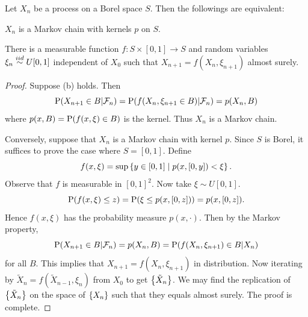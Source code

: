 \begin{proposition}
    Let $X_n$ be a process on a Borel space $S$. Then the followings are equivalent:
    \begin{thmenum}
        \item $X_n$ is a Markov chain with kernels $p$ on $S$. 
        \item There is a measurable function $f:S\times [0,1]\to S$ and random variables 
        $\xi_n\iidsim U[0,1]$ independent of $X_0$ such that $X_{n+1} = f(X_n, \xi_{n+1})$ 
        almost surely. 
    \end{thmenum}  
\end{proposition}
\begin{proof}
    Suppose (b) holds. Then 
    \begin{equation*}
        \P(X_{n+1}\in B|\F_n) = \P(f(X_n, \xi_{n+1}\in B)|\F_n) 
        = p(X_n, B)
    \end{equation*}
    where $p(x, B) = \P(f(x, \xi)\in B)$ is the kernel. Thus $X_n$ is a Markov 
    chain. 

    Conversely, suppose that $X_n$ is a Markov chain with kernel $p$. Since $S$ 
    is Borel, it suffices to prove the case where $S = [0,1]$. Define
    \begin{equation*}
        f(x, \xi) = \sup\Set{y\in [0,1]}{p(x, [0, y])< \xi}.
    \end{equation*}
    Observe that $f$ is measurable in $[0,1]^2$. Now take $\xi\sim U[0,1]$. 
    \begin{equation*}
        \P(f(x, \xi)\leq z) = \P(\xi\leq p(x, [0,z])) = p(x, [0,z]). 
    \end{equation*}
    Hence $f(x, \xi)$ has the probability measure $p(x,\cdot)$. Then by the Markov 
    property, 
    \begin{equation*}
        \P(X_{n+1}\in B|\F_n) = p(X_n, B) = \P(f(X_n, \xi_{n+1})\in B|X_n) 
    \end{equation*}
    for all $B$. This implies that $X_{n+1} = f(X_n, \xi_{n+1})$ in distribution. 
    Now iterating by $\tilde{X}_n = f(\tilde{X}_{n-1},\xi_n)$ from $X_0$ to get $\set{\tilde{X}_n}$. 
    We may find the replication of $\set{\tilde{X}_n}$ on the space of $\set{X_n}$ 
    such that they equals almost surely. The proof is complete. 
\end{proof}

